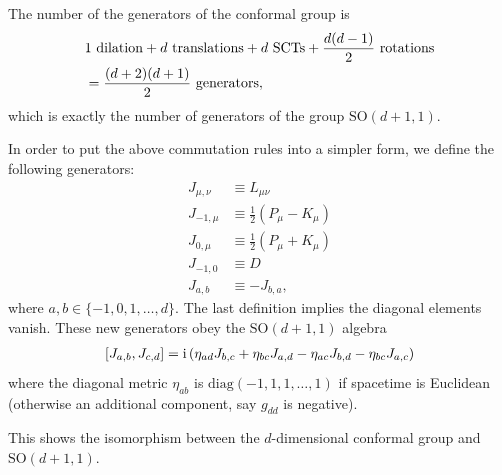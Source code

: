 \documentclass[10pt]{article}
\newcommand{\ii}{\mathrm{i}}
\begin{document}
\begin{remark}
    The number of the generators of the conformal group is
    \begin{align}
         & 1\ \mathrm{dilation}+d\ \mathrm{translations}+d\ \mathrm{SCTs}+\frac{d(d-1)}{2}\ \mathrm{rotations}\notag \\
         & =\frac{(d+2)(d+1)}{2}\ \mathrm{generators},
    \end{align}
    which is exactly the number of generators of the group $\mathrm{SO}(d+1,1)$.
    
    In order to put the above commutation rules into a simpler form, we define the following generators\snm:
    \begin{align}
        J_{\mu,\nu} & \equiv L_{\mu\nu}               \\
        J_{-1,\mu}  & \equiv \frac{1}{2}(P_\mu-K_\mu) \\
        J_{0,\mu}   & \equiv \frac{1}{2}(P_\mu+K_\mu) \\
        J_{-1,0}    & \equiv D                        \\
        J_{a,b}     & \equiv-J_{b,a},
    \end{align}
    where $a,b\in\{-1,0,1,\dots,d\}$.
    The last definition implies the diagonal elements vanish.
    These new generators obey the $\mathrm{SO}(d+1,1)$ algebra
    \begin{align}
        \comm{J_{a,b}}{J_{c,d}}=\ii\left(\eta_{ad}J_{b,c}+\eta_{bc}J_{a,d}-\eta_{ac}J_{b,d}-\eta_{bc}J_{a,c}\right)
    \end{align}
    where the diagonal metric $\eta_{ab}$ is $\mathrm{diag}(-1,1,1,\dots,1)$ if spacetime is Euclidean (otherwise an additional component, say $g_{dd}$ is negative).
    
    This shows the isomorphism between the $d$-dimensional conformal group and $\mathrm{SO}(d+1,1)$.
\end{remark}
\end{document}
